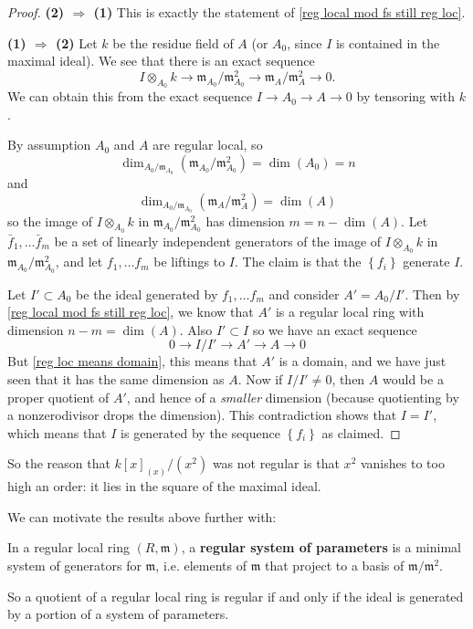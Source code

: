 \begin{proof} \textbf{(2) $\Rightarrow$ (1)} This is exactly the statement of
\cref{reg local mod fs still reg loc}.

\noindent \textbf{(1) $\Rightarrow$ (2)} 
Let $k$ be the residue field of $A$ (or $A_0$, since $I$ is contained in the
maximal ideal).
We see that there is an exact sequence
\[I \otimes_{A_0} k \to \mathfrak{m}_{A_0}/\mathfrak{m}_{A_0}^2 \to \mathfrak{m}_{A}/\mathfrak{m}_{A}^2  \to 0.\]
We can obtain this from the exact sequence $I \to A_0 \to A \to 0$ by tensoring
with $k$. 

By assumption $A_0$ and $A$ are regular local, so
\[\dim_{A_0/\mathfrak{m}_{A_0}}(\mathfrak{m}_{A_0}/\mathfrak{m}_{A_0}^2)=\dim(A_0)=n\]
and
\[\dim_{A_0/\mathfrak{m}_{A_0}}(\mathfrak{m}_{A}/\mathfrak{m}_{A}^2)=\dim(A)\]
so the image of $I\otimes_{A_0} k$ in $\mathfrak{m}_{A_0}/\mathfrak{m}_{A_0}^2$
has dimension $m=n-\dim(A)$. Let $\bar{f}_1, \ldots \bar{f}_m$ be a set of
linearly independent generators of the image of $I
\otimes_{A_0} k$ in $\mathfrak{m}_{A_0}/\mathfrak{m}_{A_0}^2$, and let $f_1, \ldots f_m$ be liftings to $I$.
The claim is that the $\left\{f_i\right\}$ generate $I$. 

Let $I' \subset A_0$ be the ideal generated by $f_1, \ldots f_m$ and consider
$A'=A_0/I'$. Then by \cref{reg local mod fs still reg loc}, we know that $A'$
is a regular local ring with dimension $n-m=\dim(A)$. Also $I' \subset I$ so we
have an exact sequence
\[0 \to I/I' \to A' \to A \to 0\]
But  \cref{reg loc means domain}, this means that $A'$ is a domain, and we
have just seen that it has the same dimension as $A$. 
Now if $I/I' \neq 0$, then $A$ would be a proper quotient of $A'$, and hence of
a \emph{smaller} dimension (because quotienting by a nonzerodivisor drops the
dimension). This contradiction shows that $I = I'$, which means that $I$ is
generated by the sequence $\left\{f_i\right\}$ as claimed.
\end{proof}

So the reason that $k[x]_{(x)}/(x^2)$ was not regular is that $x^2$ vanishes to
too high an order: it lies in the square of the maximal ideal.

We can motivate the results above further with:
\begin{definition} 
In a regular local ring $(R, \mathfrak{m})$, a \textbf{regular system of
parameters} is a minimal system of generators for $\mathfrak{m}$, i.e. elements
of $\mathfrak{m}$ that project to a basis of $\mathfrak{m}/\mathfrak{m}^2$.
\end{definition} 
So a quotient of a regular local ring is regular if and only if the ideal is
generated by a portion of a system of parameters. 

